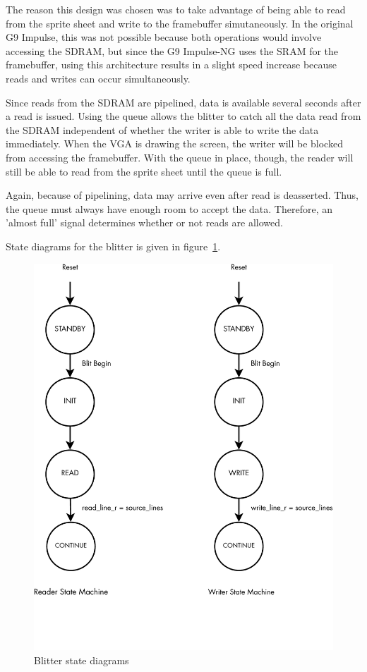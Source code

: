 \documentclass{report}
\begin{document}
The reason this design was chosen was to take advantage of being able to
read from the sprite sheet and write to the framebuffer simutaneously.
In the original G9 Impulse, this was not possible because both
operations would involve accessing the SDRAM, but since the G9
Impulse-NG uses the SRAM for the framebuffer, using this architecture
results in a slight speed increase because reads and writes can occur
simultaneously.

Since reads from the SDRAM are pipelined, data is available several
seconds after a read is issued. Using the queue allows the blitter to
catch all the data read from the SDRAM independent of whether the writer
is able to write the data immediately. When the VGA is drawing the
screen, the writer will be blocked from accessing the framebuffer. With the
queue in place, though, the reader will still be able to read from the
sprite sheet until the queue is full.

Again, because of pipelining, data may arrive even after read is
deasserted. Thus, the queue must always have enough room to accept the
data. Therefore, an 'almost full' signal determines whether or not reads
are allowed.

State diagrams for the blitter is given in
figure~\ref{fig:blitter_state}.

\begin{figure}[htb!]
    \begin{center}
        \includegraphics[width=4.5in,trim=0 1.5in 0 0,clip=true]{blitter_state}
    \end{center}
    \caption{Blitter state diagrams}
    \label{fig:blitter_state}
\end{figure}
\end{document}
